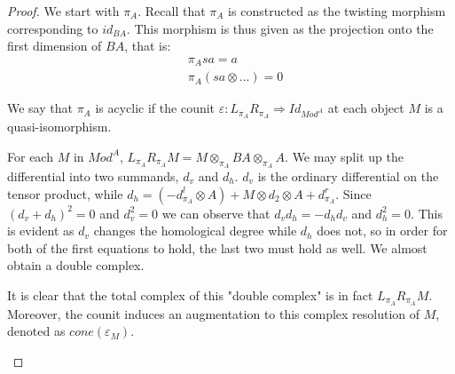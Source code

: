 \documentclass[../thesis.tex]{subfiles}
\begin{document}
            \begin{proof}
                We start with $\pi_A$. Recall that $\pi_A$ is constructed as the twisting morphism corresponding to $id_{BA}$. This morphism is thus given as the projection onto the first dimension of $BA$, that is:
                \begin{align*}
                    & \pi_A{sa} = a \\
                    & \pi_A(sa\otimes ...) = 0
                \end{align*}

                We say that $\pi_A$ is acyclic if the counit $\varepsilon : L_{\pi_A}R_{\pi_A} \Rightarrow Id_{Mod^A}$ at each object $M$ is a quasi-isomorphism.

                For each $M$ in $Mod^A$, $L_{\pi_A}R_{\pi_A}M = M\otimes_{\pi_A}BA\otimes_{\pi_A}A$. We may split up the differential into two summands, $d_v$ and $d_h$. $d_v$ is the ordinary differential on the tensor product, while $d_h = (-d^l_{\pi_A}\otimes A) + M\otimes d_2 \otimes A + d^r_{\pi_A}$. Since $(d_v + d_h)^2 = 0$ and $d_v^2 = 0$ we can observe that $d_vd_h = -d_hd_v$ and $d_h^2 = 0$. This is evident as $d_v$ changes the homological degree while $d_h$ does not, so in order for both of the first equations to hold, the last two must hold as well. We almost obtain a double complex.
                \begin{center}
                \end{center}
                It is clear that the total complex of this "double complex" is in fact $L_{\pi_A}R_{\pi_A}M$. Moreover, the counit induces an augmentation to this complex resolution of $M$, denoted as $cone(\varepsilon_M)$. 
                \begin{center}
                \end{center}
                

\end{proof}
\end{document}
